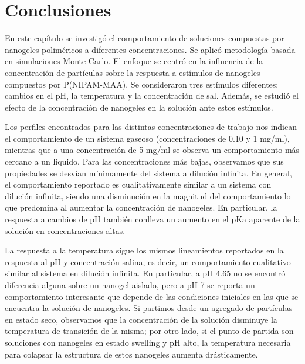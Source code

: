 	
	

	\section{Conclusiones}

	En este cap\'itulo se investig\'o el comportamiento de soluciones compuestas por nanogeles polim\'ericos a diferentes concentraciones. Se aplic\'o metodolog\'ia basada en simulaciones Monte Carlo. El enfoque se centr\'o en la influencia de la concentraci\'on de part\'iculas sobre la respuesta a est\'imulos de nanogeles compuestos por P(NIPAM-MAA). Se consideraron tres est\'imulos diferentes: cambios en el pH, la temperatura y la concentraci\'on de sal. Adem\'as, se estudi\'o el efecto de la concentraci\'on de nanogeles en la soluci\'on ante estos est\'imulos.
	
	Los perfiles encontrados para las distintas concentraciones de trabajo nos indican el comportamiento de un sistema gaseoso (concentraciones de 0.10 y 1 mg/ml), mientras que a una concentraci\'on de 5 mg/ml se observa un comportamiento m\'as cercano a un l\'iquido. Para las concentraciones m\'as bajas, observamos que sus propiedades se desv\'ian m\'inimamente del sistema a diluci\'on infinita. 
	 En general, el comportamiento reportado es cualitativamente similar a un sistema con diluci\'on infinita, siendo una disminuci\'on en la magnitud del comportamiento lo que predomina al aumentar la concentraci\'on de nanogeles. En particular, la respuesta a cambios de pH tambi\'en conlleva un aumento en el pKa aparente de la soluci\'on en concentraciones altas.
	
	La respuesta a la temperatura sigue los mismos lineamientos reportados en la respuesta al pH y concentraci\'on salina, es decir, un comportamiento cualitativo similar al sistema en diluci\'on infinita. En particular, a pH 4.65 no se encontr\'o diferencia alguna sobre un nanogel aislado, pero a pH 7 se reporta un comportamiento interesante que depende de las condiciones iniciales en las que se encuentra la soluci\'on de nanogeles. Si partimos desde un agregado de part\'iculas en estado seco, observamos que la concentraci\'on de la soluci\'on disminuye la temperatura de transici\'on de la misma; por otro lado, si el punto de partida son soluciones con nanogeles en estado swelling y pH alto, la temperatura necesaria para colapsar la estructura de estos nanogeles aumenta dr\'asticamente.
	
	
	
	
	
	
	
	